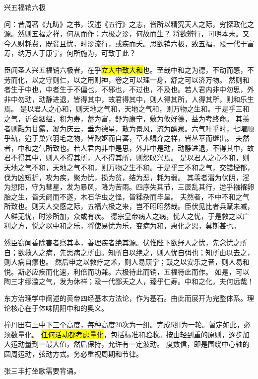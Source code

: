 \begin{shadequote}
兴五福销六极

问：昔周著《九畴》之书，汉述《五行》之志，皆所以精究天人之际，穷探政化之源。然则五福之祥，何从而作；六极之沴，何故而生？
将欲辨行，可明本末。又今人财耗费，既贫且忧，时沴流行，或疾而夭。思欲销六极，致五福，殴一代于富寿，纳万人于康宁。何所施为，可致于此？

臣闻圣人兴五福销六极者，在乎\hl{立大中致大和}也。至哉中和之为德，不动而感，不劳而化，以之守则仁，以之用则神，卷之可以理一身，舒之可以济万物。
然则和者生于中也，中者生于不偏也，不邪也，不过也，不及也。若人君内非中勿思，外非中勿动，动静进退，皆得其中，故君得其中，则人得其所，人得其所，则和乐生焉。
是以君人之心和，则天地之气和，天地之气和，则万物之生和。于是乎三和之气，䜣合絪缊，积为寿，蓄为富，舒为康宁，敷为攸好德，益为考终命。
其羡者则融为甘露，凝为庆云，垂为德星，散为景风，流为醴泉。六气叶乎时，七曜顺乎轨，迨于巢穴羽毛之物，皆煦妪而自蕃，草木鳞介之祥，皆丛萃而继出。
夫然者，中和之气所致也。若人君内非中是思，外非中是动，动静进退，不得其中，故君不得其中，则人不得其所，人不得其所，则怨叹兴焉。
是以君人之心不和，则天地之气不和，天地之气不和，则万物之生不和。于是乎三不和之气，交错堙郁，伐为凶短折，攻为疾，聚为忧，损为贫，结为恶，耗为弱。
其羡者潜为伏阴，淫为愆阳，守为彗星，发为暴风，降为苦雨。四序失其节，三辰乱其行，迨乎襁褓卵胎之生，皆夭阏而不遂，木石华虫之怪，皆糅杂而毕呈。
夫然者，不中不和之气所致也。则天人交感之际，五福六极之来，岂不昭昭然哉。臣伏见比者兵赋未减，人鲜无忧，时沴所加，众或有疾。
德宗皇帝病人之病，忧人之忧，于是救之以广利之方，悦之以中和之乐，将使易忧为乐，变病为和，惠化之恩，莫斯甚也。

然臣窃闻善除害者察其本，善理疾者绝其源。伏惟陛下欲纾人之忧，先念忧之所自；欲救人之病，先思病之所由。知所自以绝之，则人忧自弭也；知所由以去之，则人病自瘳也。
然后申之以救疗之术，则人易康宁；鼓之以安乐之音，则人易和悦。斯必应疾而化速，利倍而功兼。六极待此而销，五福待此而作。
如是，可以陶三才缪滥之气，发为休祥；殴一代鄙夭之人，臻乎仁寿。中和之化，夫何远哉！
\end{shadequote}

东方治理学中阐述的黄帝四经基本方法论，作为基石。由此而展开为完整体系。理论核心在于体味阴阳中和的奥义。

撞丹田有上中下三个高度，每种高度20次为一组。完成5组为一轮。暂定如此，必须数量化。
\hl{任何活动都考虑量化}，包括标准和验收。按由轻到重的原则，逐步加大运动量到一最大值，然后保持，允许有一定波动。
度数信，即是围绕中心轴的圆周运动，弦动方式。务必重视周期和节律。

张三丰打坐歌需要背诵。

